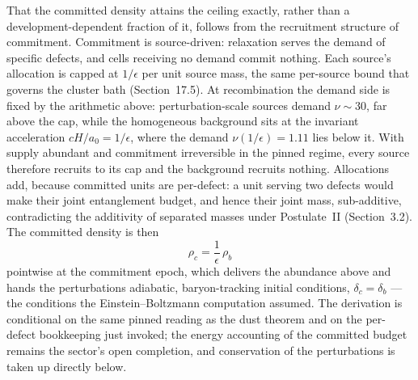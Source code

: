 \documentclass[11pt]{article}
\begin{document}
That the committed density attains the ceiling exactly, rather than a development-dependent fraction of it, follows from the recruitment structure of commitment. Commitment is source-driven: relaxation serves the demand of specific defects, and cells receiving no demand commit nothing. Each source's allocation is capped at $1/\epsilon$ per unit source mass, the same per-source bound that governs the cluster bath (Section~17.5). At recombination the demand side is fixed by the arithmetic above: perturbation-scale sources demand $\nu\sim30$, far above the cap, while the homogeneous background sits at the invariant acceleration $cH/a_0=1/\epsilon$, where the demand $\nu(1/\epsilon)=1.11$ lies below it. With supply abundant and commitment irreversible in the pinned regime, every source therefore recruits to its cap and the background recruits nothing. Allocations add, because committed units are per-defect: a unit serving two defects would make their joint entanglement budget, and hence their joint mass, sub-additive, contradicting the additivity of separated masses under Postulate~II (Section~3.2). The committed density is then
\[
\rho_c=\frac{1}{\epsilon}\,\rho_b
\]
pointwise at the commitment epoch, which delivers the abundance above and hands the perturbations adiabatic, baryon-tracking initial conditions, $\delta_c=\delta_b$ --- the conditions the Einstein--Boltzmann computation assumed. The derivation is conditional on the same pinned reading as the dust theorem and on the per-defect bookkeeping just invoked; the energy accounting of the committed budget remains the sector's open completion, and conservation of the perturbations is taken up directly below.
\end{document}

